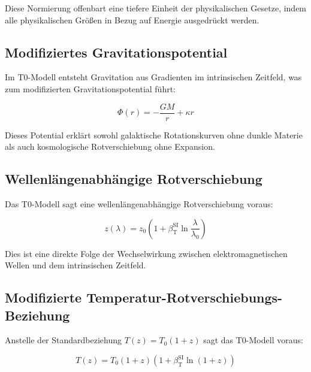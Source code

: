 \documentclass[12pt,a4paper]{article}
\newcommand{\betaT}{\beta_{\text{T}}}
\begin{document}
	Diese Normierung offenbart eine tiefere Einheit der physikalischen Gesetze, indem alle physikalischen Größen in Bezug auf Energie ausgedrückt werden\cite{pascher_alpha_2025}.
	
	\subsection{Modifiziertes Gravitationspotential}
	\label{subsec:modified_gravity}
	
	Im T0-Modell entsteht Gravitation aus Gradienten im intrinsischen Zeitfeld\cite{pascher_emergente_gravitation_2025}, was zum modifizierten Gravitationspotential führt:
	
	\begin{equation}
		\label{eq:t0_gravity}
		\Phi(r) = -\frac{GM}{r} + \kappa r
	\end{equation}
	
	Dieses Potential erklärt sowohl galaktische Rotationskurven ohne dunkle Materie\cite{pascher_galaxies_2025} als auch kosmologische Rotverschiebung ohne Expansion\cite{pascher_messdifferenzen_2025}.
	
	\subsection{Wellenlängenabhängige Rotverschiebung}
	\label{subsec:wavelength_redshift}
	
	Das T0-Modell sagt eine wellenlängenabhängige Rotverschiebung voraus\cite{pascher_messdifferenzen_2025}:
	
	\begin{equation}
		\label{eq:t0_redshift}
		z(\lambda) = z_0\left(1 + \betaT^{\text{SI}} \ln\frac{\lambda}{\lambda_0}\right)
	\end{equation}
	
	Dies ist eine direkte Folge der Wechselwirkung zwischen elektromagnetischen Wellen und dem intrinsischen Zeitfeld\cite{pascher_photons_2025}.
	
	\subsection{Modifizierte Temperatur-Rotverschiebungs-Beziehung}
	\label{subsec:temp_redshift}
	
	Anstelle der Standardbeziehung $T(z) = T_0(1+z)$ sagt das T0-Modell voraus\cite{pascher_temp_2025}:
	
	\begin{equation}
		\label{eq:t0_temperature}
		T(z) = T_0 (1+z)(1+\betaT^{\text{SI}} \ln(1+z))
	\end{equation}
	
\end{document}
